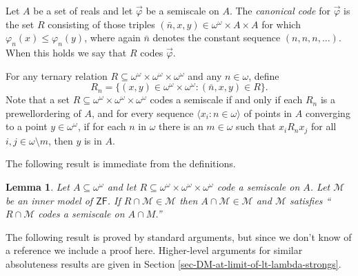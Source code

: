 \documentclass[fleqn, 11pt]{amsart}
\theoremstyle{plain}
\newtheorem{lem}[thm]{Lemma} \newtheorem*{lem*}{Lemma}
\theoremstyle{definition}
\theoremstyle{remark}
\begin{document}
Let $A$ be a set of reals and let $\vec{\varphi}$ be a semiscale on $A$.
The \emph{canonical code} for $\vec{\varphi}$
is the set $R$ consisting of those triples $(\bar{n},x,y) \in \omega^\omega \times A \times A$ for which
$\varphi_{n}(x) \le \varphi_{n}(y)$, where again $\bar{n}$ denotes the constant sequence $(n,n,n,\ldots)$.
When this holds we say that $R$ codes $\vec{\varphi}$. 


For any ternary relation $R \subseteq \omega^\omega \times \omega^\omega \times \omega^\omega$ and any $n \in \omega$, define
\[ R_n = \{ (x,y) \in \omega^\omega \times \omega^\omega : (\bar{n}, x, y) \in R\}.\]
Note that a set  $R \subseteq \omega^\omega \times \omega^\omega \times \omega^\omega$ codes a semiscale if and only if
each $R_n$ is a prewellordering of $A$, and
for every sequence $\langle x_i : n \in \omega\rangle$ of points in $A$ converging to a point $y \in \omega^\omega$,
if for each $n$ in $\omega$ there is an $m \in \omega$ such that $x_{i}R_{n}x_{j}$ for all $i,j \in \omega \setminus m$, then $y$ is in $A$. 






The following result is immediate from the definitions.

\begin{lem}\label{restrictscaleslemma}
 Let $A \subseteq \omega^\omega$ and let $R \subseteq \omega^\omega \times \omega^\omega \times \omega^\omega$ code a semiscale on $A$.
 Let $\mathcal{M}$ be an inner model of $\mathsf{ZF}$.
 If $R \cap \mathcal{M} \in \mathcal{M}$ then $A \cap \mathcal{M} \in \mathcal{M}$ and
$\mathcal{M}$ satisfies ``$R \cap \mathcal{M}$ codes a semiscale on $A \cap M$.''
\end{lem}

The following result is proved by standard arguments, but since we don't know of a reference we include a proof here. Higher-level arguments for similar absoluteness results are given in Section \ref{sec-DM-at-limit-of-lt-lambda-strongs}. 
\end{document}
